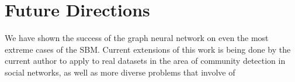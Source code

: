 \chapter{Future Directions}

We have shown the success of the graph neural network on even the most extreme cases of the SBM.  Current extensions of this work is being done by the current author to apply to real datasets in the area of community detection in social networks, as well as more diverse problems that involve of 